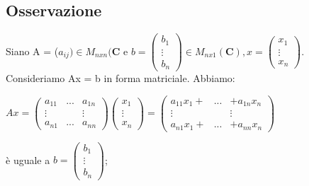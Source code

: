 \documentclass[12pt]{article}
\begin{document}
\subsection{Osservazione}

Siano A = ($a_{ij}) \in M_{nxn} (\mathbf{C}$ e $b = \begin{pmatrix}
    b_1\\
    \vdots\\
    b_n
\end{pmatrix} \in M_{nx1} (\mathbf{C}), x = \begin{pmatrix}
    x_1\\
    \vdots\\
    x_n
\end{pmatrix}$. Consideriamo  Ax = b in forma matriciale. Abbiamo:

\begin{center}
$Ax = \begin{pmatrix}
    a_{11} & ... & a_{1n}\\
    \vdots & & \vdots\\
    a_{n1} & ... & a_{nn}
\end{pmatrix}\begin{pmatrix}
    x_1\\
    \vdots\\
    x_n
\end{pmatrix} = \begin{pmatrix}
    a_{11}x_1 + & ... & + a_{1n}x_n\\
    \vdots & & \vdots\\
    a_{n1}x_1 + & ... & + a_{nn}x_n
\end{pmatrix}$
\end{center}
è uguale a $b = \begin{pmatrix}
    b_1\\
    \vdots\\
    b_n
\end{pmatrix}$;
\end{document}
